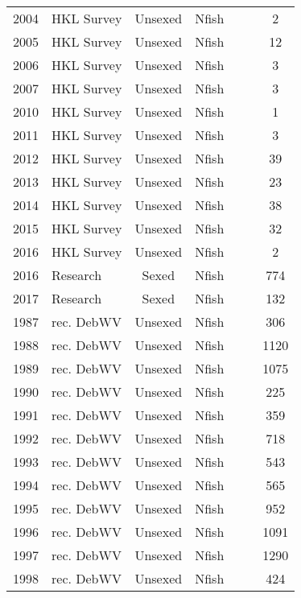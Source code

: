 \begin{longtable}[t]{c>{\centering\arraybackslash}p{3cm}ccccc}
2004 & HKL Survey & Unsexed & Nfish &  &  & 2\\
2005 & HKL Survey & Unsexed & Nfish &  &  & 12\\
2006 & HKL Survey & Unsexed & Nfish &  &  & 3\\
2007 & HKL Survey & Unsexed & Nfish &  &  & 3\\
2010 & HKL Survey & Unsexed & Nfish &  &  & 1\\
2011 & HKL Survey & Unsexed & Nfish &  &  & 3\\
2012 & HKL Survey & Unsexed & Nfish &  &  & 39\\
2013 & HKL Survey & Unsexed & Nfish &  &  & 23\\
2014 & HKL Survey & Unsexed & Nfish &  &  & 38\\
2015 & HKL Survey & Unsexed & Nfish &  &  & 32\\
2016 & HKL Survey & Unsexed & Nfish &  &  & 2\\
2016 & Research & Sexed & Nfish &  &  & 774\\
2017 & Research & Sexed & Nfish &  &  & 132\\
1987 & rec. DebWV & Unsexed & Nfish &  &  & 306\\
1988 & rec. DebWV & Unsexed & Nfish &  &  & 1120\\
1989 & rec. DebWV & Unsexed & Nfish &  &  & 1075\\
1990 & rec. DebWV & Unsexed & Nfish &  &  & 225\\
1991 & rec. DebWV & Unsexed & Nfish &  &  & 359\\
1992 & rec. DebWV & Unsexed & Nfish &  &  & 718\\
1993 & rec. DebWV & Unsexed & Nfish &  &  & 543\\
1994 & rec. DebWV & Unsexed & Nfish &  &  & 565\\
1995 & rec. DebWV & Unsexed & Nfish &  &  & 952\\
1996 & rec. DebWV & Unsexed & Nfish &  &  & 1091\\
1997 & rec. DebWV & Unsexed & Nfish &  &  & 1290\\
1998 & rec. DebWV & Unsexed & Nfish &  &  & 424\\*
\end{longtable}
\endgroup{}
\endgroup{}
